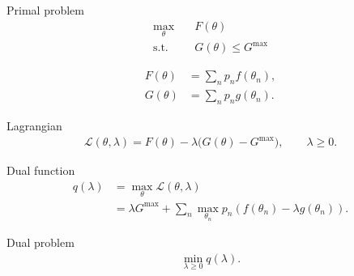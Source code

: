\documentclass{article}
\begin{document}


Primal problem
\begin{align}
    \max_{\theta} \quad & F(\theta) \\
    \text{s.t.} \quad & G(\theta) \le G^{\max}
\end{align}

\begin{align}
F(\theta) &= \sum_n p_n f(\theta_n), \\
G(\theta) &= \sum_n p_n g(\theta_n).
\end{align}

Lagrangian
\begin{align}
\mathcal{L}(\theta,\lambda)
=
F(\theta)
-
\lambda \bigl(G(\theta)-G^{\max}\bigr),
\qquad
\lambda \ge 0.
\end{align}

Dual function
\begin{align}
q(\lambda)
&=
\max_{\theta}
\mathcal{L}(\theta,\lambda)
\\
&=
\lambda G^{\max}
+
\sum_n
\max_{\theta_n}
p_n \left(
f(\theta_n)
-
\lambda g(\theta_n)
\right).
\end{align}

Dual problem
\begin{align}
\min_{\lambda \ge 0} q(\lambda).
\end{align}
\end{document}

